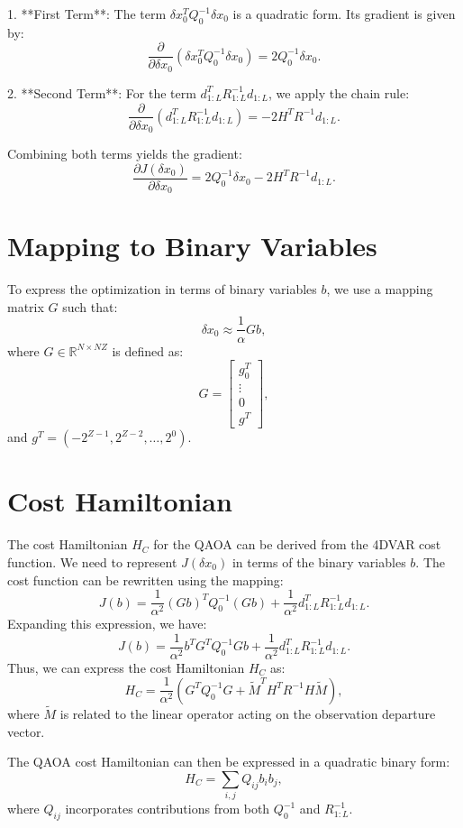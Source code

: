 \documentclass{article}
\begin{document}
1. **First Term**:
   The term \( \delta x_0^T Q_0^{-1} \delta x_0 \) is a quadratic form. Its gradient is given by:
   \[
   \frac{\partial}{\partial \delta x_0} \left( \delta x_0^T Q_0^{-1} \delta x_0 \right) = 2 Q_0^{-1} \delta x_0.
   \]

2. **Second Term**:
   For the term \( d_{1:L}^T R_{1:L}^{-1} d_{1:L} \), we apply the chain rule:
   \[
   \frac{\partial}{\partial \delta x_0} \left( d_{1:L}^T R_{1:L}^{-1} d_{1:L} \right) = -2 H^T R^{-1} d_{1:L}.
   \]

Combining both terms yields the gradient:
\begin{equation}
\frac{\partial J(\delta x_0)}{\partial \delta x_0} = 2 Q_0^{-1} \delta x_0 - 2 H^T R^{-1} d_{1:L}.
\end{equation}

\section{Mapping to Binary Variables}
To express the optimization in terms of binary variables \( b \), we use a mapping matrix \( G \) such that:
\[
\delta x_0 \approx \frac{1}{\alpha} G b,
\]
where \( G \in \mathbb{R}^{N \times NZ} \) is defined as:
\[
G = \begin{bmatrix}
g_0^T \\
\vdots \\
0 \\
g^T
\end{bmatrix},
\]
and \( g^T = \left( -2^{Z-1}, 2^{Z-2}, \ldots, 2^0 \right) \).

\section{Cost Hamiltonian}
The cost Hamiltonian \( H_C \) for the QAOA can be derived from the 4DVAR cost function. We need to represent \( J(\delta x_0) \) in terms of the binary variables \( b \).
The cost function can be rewritten using the mapping:
\[
J(b) = \frac{1}{\alpha^2} \left( G b \right)^T Q_0^{-1} \left( G b \right) + \frac{1}{\alpha^2} d_{1:L}^T R_{1:L}^{-1} d_{1:L}.
\]
Expanding this expression, we have:
\[
J(b) = \frac{1}{\alpha^2} b^T G^T Q_0^{-1} G b + \frac{1}{\alpha^2} d_{1:L}^T R_{1:L}^{-1} d_{1:L}.
\]
Thus, we can express the cost Hamiltonian \( H_C \) as:
\begin{equation}
H_C = \frac{1}{\alpha^2} \left( G^T Q_0^{-1} G + \tilde{M}^T H^T R^{-1} H \tilde{M} \right),
\end{equation}
where \( \tilde{M} \) is related to the linear operator acting on the observation departure vector.

The QAOA cost Hamiltonian can then be expressed in a quadratic binary form:
\begin{equation}
H_C = \sum_{i,j} Q_{ij} b_i b_j,
\end{equation}
where \( Q_{ij} \) incorporates contributions from both \( Q_0^{-1} \) and \( R_{1:L}^{-1} \).
\end{document}
